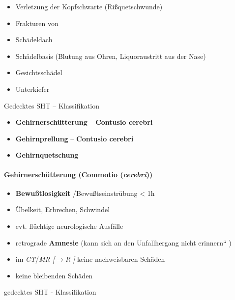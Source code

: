 \documentclass{article}
\newcommand\gEs[1]{\textbf{\textcolor[rgb]{0.0,0.0,0.5019608}{#1}}}
\newcommand\gEs[1]{\textbf{\textcolor[rgb]{0.0,0.0,0.5019608}{#1}}}
\newcommand\gT[1]{\textbf{\textup{\textcolor[rgb]{0.0,0.5019608,0.0}{#1}}}}
\newcommand\gZ[1]{\textcolor[rgb]{0.5019608,0.5019608,0.5019608}{#1}}
\begin{document}
\begin{itemize}
\item {\mdseries
Verletzung der Kopfschwarte  (Ri{\ss}quetschwunde)}

\item {\mdseries
Frakturen von}

\end{itemize}
\begin{itemize}
\item {\mdseries
Sch\"adeldach}

\item {\mdseries
Sch\"adelbasis (Blutung aus Ohren, Liquoraustritt  aus der Nase)}

\item {\mdseries
Gesichtssch\"adel}

\item {\mdseries
Unterkiefer}

\end{itemize}
{\mdseries\color[rgb]{0.0,0.0,0.5019608}
Gedecktes SHT -- Klassifikation}

\begin{itemize}
\item {\mdseries
\gT{Gehirnersch\"utterung}  {}--
\gT{Contusio cerebri}}

\item {\mdseries
\gT{Gehirnprellung}  {}-- \gT{Contusio
cerebri}}

\item {\mdseries
\gT{Gehirnquetschung}}

\end{itemize}
\paragraph[Gehirnersch\"utterung (Commotio
(cerebri))]{Gehirnersch\"utterung (Commotio (\textit{cerebri}))}
\begin{itemize}
\item {\mdseries
 \gEs{Bewu{\ss}tlosigkeit} /Bewu{\ss}tseinstr\"ubung
{\textless}  1h}

\item {\mdseries
\"Ubelkeit, Erbrechen, Schwindel}

\item {\mdseries
evt. fl\"uchtige neurologische Ausf\"alle}

\item {\mdseries
retrograde  \gEs{Amnesie}  ({\quotedblbase}kann sich
an den Unfallhergang nicht erinnern{\textquotedblleft} )}

\end{itemize}
\begin{itemize}
\item {\mdseries
\gZ{im
}\gZ{\textit{CT}}\gZ{/}\gZ{\textit{MR
[${\rightarrow}$}}\gZ{\textit{R}}\gZ{\textit{{}-}}\gZ{\textit{\pageref{bkm:LexComputertomographie}}}\gZ{\textit{]
}}\gZ{keine nachweisbaren Sch\"aden}}

\item {\mdseries
keine  bleibenden Sch\"aden}

\end{itemize}
{\mdseries
gedecktes SHT - Klassifikation}
\end{document}
